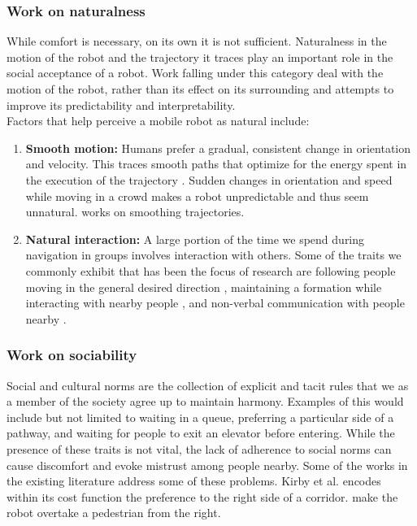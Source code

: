 \subsubsection{Work on naturalness}
While comfort is necessary, on its own it is not sufficient. Naturalness in the motion of the robot and the trajectory it traces play an important role in the social acceptance of a robot. Work falling under this category deal with the motion of the robot, rather than its effect on its surrounding and attempts to improve its predictability and interpretability.\\ %
Factors that help perceive a mobile robot as natural include:
\begin{enumerate}
    \item \textbf{Smooth motion:} Humans prefer a gradual, consistent change in orientation and velocity. This traces smooth paths that optimize for the energy spent in the execution of the trajectory \cite{arechavaleta_nonholonomic_2008}. Sudden changes in orientation and speed while moving in a crowd makes a robot unpredictable and thus seem unnatural. \cite{pandey_alami_robot_guide_2009, pandey_2010_human_centered_nav } works on smoothing trajectories.
    \item \textbf{Natural interaction:} A large portion of the time we spend during navigation in groups involves interaction with others. Some of the traits we commonly exhibit that has been the focus of research are following people moving in the general desired direction \cite{gockley_natural_person_following_2007}, maintaining a formation while interacting with nearby people \cite{althaus_nav_for_human_robot_interaction_2004}, and non-verbal communication with people nearby \cite{sauliner_minimal_nonverbal_interruption_2011}. 
    
\end{enumerate}

\subsubsection{Work on sociability}
Social and cultural norms are the collection of explicit and tacit rules that we as a member of the society agree up to maintain harmony. Examples of this would include but not limited to waiting in a queue, preferring a particular side of a pathway, and waiting for people to exit an elevator before entering. While the presence of these traits is not vital, the lack of adherence to social norms can cause discomfort and evoke mistrust among people nearby. Some of the works in the existing literature address some of these problems. Kirby et al. \cite{kriby_companion_2009} encodes within its cost function the preference to the right side of a corridor. \cite{pandey_alami_robot_guide_2009} make the robot overtake a pedestrian from the right.\\


